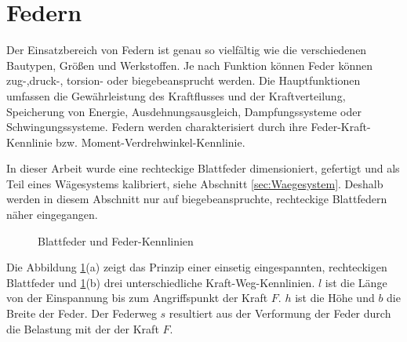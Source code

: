 \newpage
\section{Federn}
\label{sec:Federn}

Der Einsatzbereich von Federn ist genau so vielfältig wie die verschiedenen Bautypen, Größen und Werkstoffen. Je nach Funktion können Feder können zug-,druck-, torsion- oder biegebeansprucht werden. 
Die Hauptfunktionen umfassen die Gewährleistung des Kraftflusses und der Kraftverteilung, Speicherung von Energie, Ausdehnungsausgleich, Dampfungssysteme oder Schwingungssysteme. 
Federn werden charakterisiert durch ihre Feder-Kraft-Kennlinie bzw. Moment-Verdrehwinkel-Kennlinie. 

In dieser Arbeit wurde eine rechteckige Blattfeder dimensioniert, gefertigt und als Teil eines Wägesystems kalibriert, siehe Abschnitt \ref{sec:Waegesystem}. Deshalb werden in diesem Abschnitt nur auf biegebeanspruchte, rechteckige Blattfedern näher eingegangen. 

\begin{figure}[htb]
\centering
{}
\caption{Blattfeder und Feder-Kennlinien \citep{Wittel2011}}
\label{fig:Federdiagramm}
\end{figure}

Die Abbildung \ref{fig:Federdiagramm}(a) zeigt das Prinzip einer einsetig eingespannten, rechteckigen Blattfeder und \ref{fig:Federdiagramm}(b) drei unterschiedliche Kraft-Weg-Kennlinien. $l$ ist die Länge von der Einspannung bis zum Angriffspunkt der Kraft $F$. $h$ ist die Höhe und $b$ die Breite der Feder. Der Federweg $s$ resultiert aus der Verformung der Feder durch die Belastung mit der der Kraft $F$.


